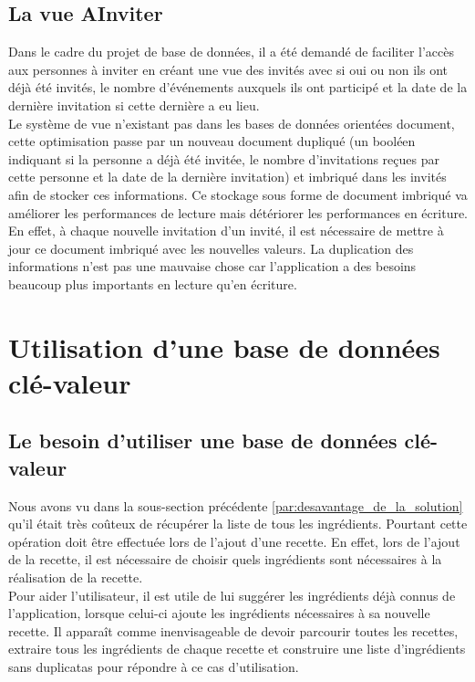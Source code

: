 	\subsection{La vue AInviter}

		Dans le cadre du projet de base de données, il a été demandé de faciliter l'accès aux personnes à inviter en créant une vue des invités avec si oui ou non ils ont déjà été invités, le nombre d’événements auxquels ils ont participé et la date de la dernière invitation si cette dernière a eu lieu.\\

		Le système de vue n'existant pas dans les bases de données orientées document, cette optimisation passe par un nouveau document dupliqué (un booléen indiquant si la personne a déjà été invitée, le nombre d'invitations reçues par cette personne et la date de la dernière invitation) et imbriqué dans les invités afin de stocker ces informations. Ce stockage sous forme de document imbriqué va améliorer les performances de lecture mais détériorer les performances en écriture. En effet, à chaque nouvelle invitation d'un invité, il est nécessaire de mettre à jour ce document imbriqué avec les nouvelles valeurs. La duplication des informations n'est pas une mauvaise chose car l'application a des besoins beaucoup plus importants en lecture qu'en écriture.


\section{Utilisation d'une base de données clé-valeur}
	\subsection{Le besoin d'utiliser une base de données clé-valeur }
		Nous avons vu dans la sous-section précédente \ref{par:desavantage_de_la_solution} qu'il était très coûteux de récupérer la liste de tous les ingrédients. Pourtant cette opération doit être effectuée lors de l'ajout d'une recette. En effet, lors de l'ajout de la recette, il est nécessaire de choisir quels ingrédients sont nécessaires à la réalisation de la recette.\\

		Pour aider l'utilisateur, il est utile de lui suggérer les ingrédients déjà connus de l'application, lorsque celui-ci ajoute les ingrédients nécessaires à sa nouvelle recette. Il apparaît comme inenvisageable de devoir parcourir toutes les recettes, extraire tous les ingrédients de chaque recette et construire une liste d'ingrédients sans duplicatas pour répondre à ce cas d'utilisation.\\


